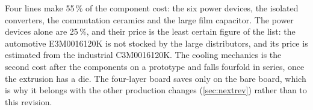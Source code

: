 Four lines make 55\,\% of the component cost: the six power devices,
the isolated converters, the commutation ceramics and the large film capacitor.
The power devices alone are 25\,\%, and their price is the least certain
figure of the list: the automotive E3M0016120K is not stocked by the large
distributors, and its price is estimated from the industrial C3M0016120K. The
cooling mechanics is the second cost after the components on a prototype and
falls fourfold in series, once the extrusion has a die. The four-layer board
saves only on the bare board, which is why it belongs with the other
production changes (\cref{sec:nextrev}) rather than to this revision.

